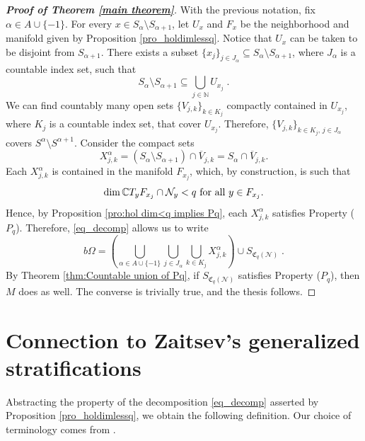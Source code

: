 \documentclass[12pt]{amsart}
\numberwithin{equation}{section}
{\theoremstyle{definition}
\newtheorem{remark}[theorem]{Remark}
}
\newcommand{\N}{\mathcal{N}}
\newcommand{\C}{\mathbb{C}}
\newcommand{\Coreof}{\mathfrak{C}}
\begin{document}
\begin{proof}[{\bf Proof of Theorem \ref{main theorem}}]
    With the previous notation, fix $\alpha\in A\cup\{-1\}$.
    For every $x \in S_{\alpha}\setminus S_{\alpha + 1}$, let $U_x$ and $F_x$ be the neighborhood and manifold given by Proposition \ref{pro_holdimlessq}. Notice that $U_x$ can be taken to be disjoint from $S_{\alpha+1}$. There exists a subset $\{x_j\}_{j \in J_{\alpha}} \subseteq S_{\alpha}\setminus S_{\alpha+1}$, where $J_{\alpha}$ is a countable index set, such that
    $$
    S_{\alpha}\setminus S_{\alpha+1}\subseteq \bigcup_{j\in\mathbb{N}} U_{x_j}\;.
    $$
    We can find countably many open sets $\{V_{j, k}\}_{k \in K_j}$ compactly contained in $U_{x_j}$, where $K_j$ is a countable index set, that cover $U_{x_j}$.  Therefore, $\{V_{j, k}\}_{k \in K_j,\, j \in J_{\alpha}}$ covers $S^\alpha\setminus S^{\alpha+1}$. 
    Consider the compact sets $$
    X_{j, k}^\alpha=(S_{\alpha}\setminus S_{\alpha+1})\cap \overline{V}_{j, k}=S_{\alpha}\cap \overline{V}_{j, k}.
    $$
    Each $X_{j, k}^\alpha$ is contained in the manifold $F_{x_j}$, which, by construction, is such that $$
    \dim \C T_yF_{x_j}\cap \N_y<q \hbox{ for all } y\in F_{x_j}.
    $$
    Hence, by Proposition \ref{pro:hol dim<q implies Pq}, each $X_{j, k}^{\alpha}$ satisfies Property ($P_q$). Therefore, \eqref{eq_decomp} allows us to write
    $$b\Omega=\left(\bigcup_{\alpha\in A\cup\{-1\}}\bigcup_{j \in J_{\alpha}}\bigcup_{k \in K_j} X^{\alpha}_{j, k} \right) \cup S_{\Coreof_q(\N)}\;.$$
    By Theorem \ref{thm:Countable union of Pq}, if $S_{\Coreof_q(\N)}$ satisfies Property ($P_q$), then $M$ does as well. The converse is trivially true, and the thesis follows.
\end{proof}

\section{Connection to Zaitsev's generalized stratifications}\label{Zaitsev section}

Abstracting the property of the decomposition \eqref{eq_decomp} asserted by Proposition \ref{pro_holdimlessq}, we obtain the following definition. Our choice of terminology comes from \cite[Definition 1.14]{Za24}. 
\end{document}
